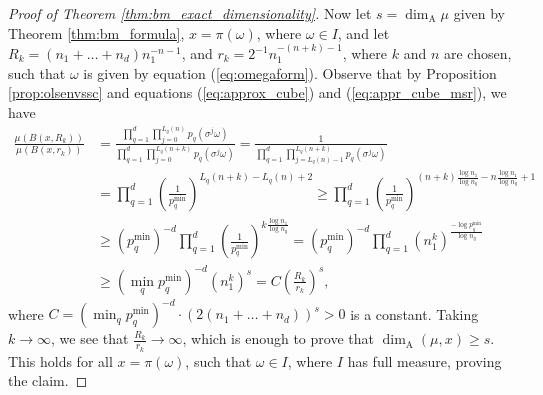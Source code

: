 \documentclass{PRM}
\newcommand{\adim}{\dim_{\mathrm{A}}}
\theoremstyle{plain}
\theoremstyle{definition}
\theoremstyle{remark}
\begin{document}
\begin{proof}[Proof of Theorem \ref{thm:bm_exact_dimensionality}]
Now let $s=\adim\mu$ given by Theorem \ref{thm:bm_formula}, $x=\pi(\omega)$, where $\omega\in I$, and let $R_k=(n_1+\ldots+n_d)n_1^{-n-1}$, and $r_k=2^{-1}n_1^{-(n+k)-1}$, where $k$ and $n$ are chosen, such that $\omega$ is given by equation (\ref{eq:omegaform}). Observe that by Proposition \ref{prop:olsenvssc} and equations (\ref{eq:approx_cube}) and (\ref{eq:appr_cube_msr}), we have
\begin{align*}
    \frac{\mu(B(x,R_k))}{\mu(B(x,r_k))}&=\frac{\prod_{q=1}^d\prod_{j=0}^{L_q(n)}p_q(\sigma^j\omega)}{\prod_{q=1}^d\prod_{j=0}^{L_q(n+k)}p_q(\sigma^j\omega)}=\frac{1}{\prod_{q=1}^d\prod_{j=L_q(n)-1}^{L_q(n+k)}p_q(\sigma^j\omega)}\\
    &=\prod_{q=1}^d\left(\frac{1}{p_q^{\min}}\right)^{L_q(n+k)-L_q(n)+2}\geq \prod_{q=1}^d\left(\frac{1}{p_q^{\min}}\right)^{(n+k)\frac{\log n_1}{\log n_q}-n\frac{\log n_1}{\log n_q}+1}\\
    &\geq (p_q^{\min})^{-d}\prod_{q=1}^d\left(\frac{1}{p_q^{\min}}\right)^{k\frac{\log n_1}{\log n_q}}=(p_q^{\min})^{-d}\prod_{q=1}^d\left(n_1^k\right)^{\frac{-\log p_q^{\min}}{\log n_q}}\\
    &\geq (\min_{q}p_q^{\min})^{-d}\left(n_1^k\right)^{s}=C\left(\frac{R_k}{r_k}\right)^{s},
\end{align*}
where $C=(\min_{q}p_q^{\min})^{-d}\cdot(2(n_1+\ldots+n_d))^s>0$ is a constant. Taking $k\to\infty$, we see that $\frac{R_k}{r_k}\to \infty$, which is enough to prove that $\dim_{\mathrm{A}}(\mu,x)\geq s$. This holds for all $x=\pi(\omega)$, such that $\omega\in I$, where $I$ has full measure, proving the claim.
\end{proof}
\end{document}
